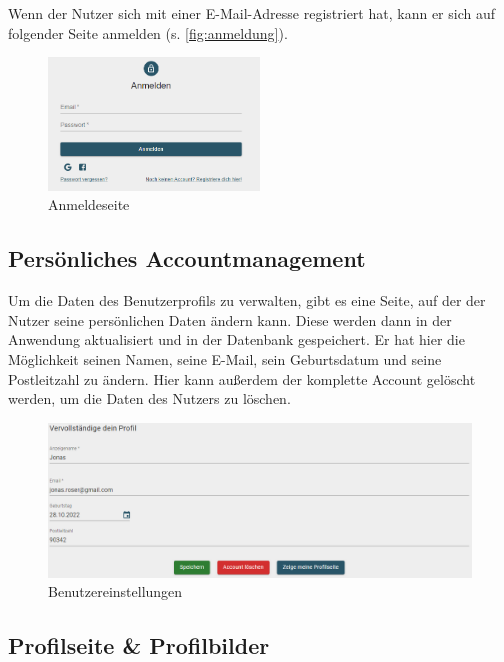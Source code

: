 Wenn der Nutzer sich mit einer E-Mail-Adresse registriert hat, kann er sich auf folgender Seite anmelden (s. \autoref{fig:anmeldung}).

\begin{figure}[!htb]
  \centering
  \includegraphics[width=0.5\textwidth]{figures/boas/21_anmelden.png}
  \caption[]{Anmeldeseite}
  \label{fig:anmeldung}
\end{figure}

\clearpage

\subsection{Persönliches Accountmanagement}
\label{sec:accountmanagement}

Um die Daten des Benutzerprofils zu verwalten, gibt es eine Seite, auf der der Nutzer seine persönlichen Daten ändern kann.
Diese werden dann in der Anwendung aktualisiert und in der Datenbank gespeichert. Er hat hier die Möglichkeit seinen Namen, seine E-Mail, sein Geburtsdatum und seine Postleitzahl zu ändern.
Hier kann außerdem der komplette Account gelöscht werden, um die Daten des Nutzers zu löschen.

\begin{figure}[ht!]
  \begin{centering}
    \includegraphics[width=1\textwidth]{figures/implementation/userSettings.png}
    \caption{Benutzereinstellungen}
    \label{fig:userSettings}
  \end{centering}
\end{figure}

\subsection{Profilseite \& Profilbilder}
\label{sec:profilepictures}

